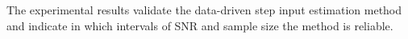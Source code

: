 The experimental results validate the data-driven step input estimation method and indicate in which intervals of SNR and sample size the method is reliable.

